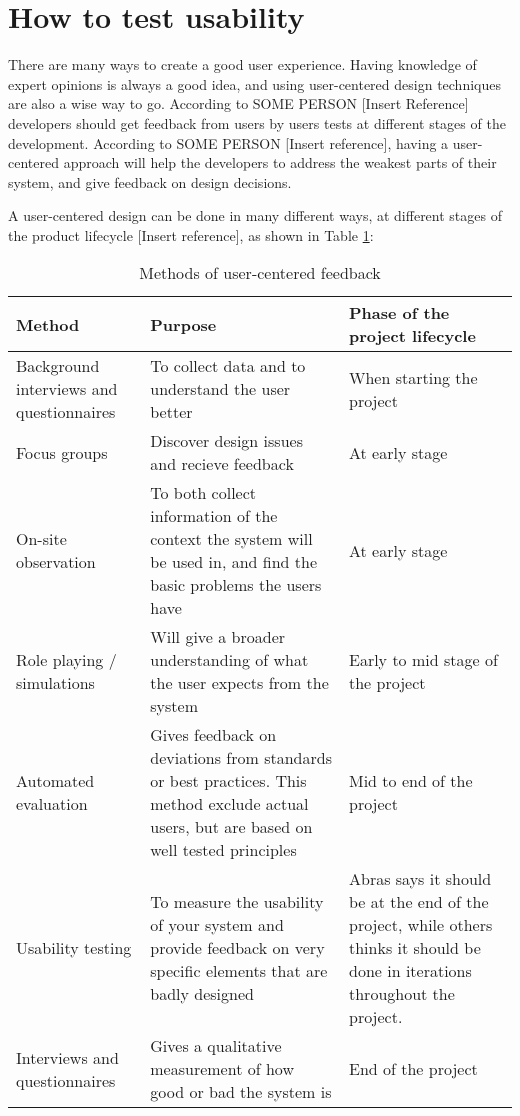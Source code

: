 \section{How to test usability}
There are many ways to create a good user experience. Having knowledge of expert opinions is always a good idea, and using user-centered design techniques are also a wise way to go. According to SOME PERSON [Insert Reference] developers should get feedback from users by users tests at different stages of the development. According to SOME PERSON [Insert reference], having a user-centered approach will help the developers to address the weakest parts of their system, and give feedback on design decisions. 

A user-centered design can be done in many different ways, at different stages of the product lifecycle [Insert reference], as shown in Table \ref{table:designduringlifecycle}:

\begin{table}[H]
\begin{tabular}{|p{5cm} | p{5cm} | p{5cm} |}
\hline
\textbf{Method} & \textbf{Purpose} & \textbf{Phase of the project lifecycle} \\ \hline
Background interviews and questionnaires & To collect data and to understand the user better & When starting the project \\ \hline
Focus groups & Discover design issues and recieve feedback & At early stage \\ \hline
On-site observation & To both collect information of the context the system will be used in, and find the basic problems the users have & At early stage \\ \hline
Role playing / simulations & Will give a broader understanding of what the user expects from the system & Early to mid stage of the project \\ \hline
Automated evaluation & Gives feedback on deviations from standards or best practices. This method exclude actual users, but are based on well tested principles & Mid to end of the project \\ \hline
Usability testing & To measure the usability of your system and provide feedback on very specific elements that are badly designed & Abras \cite{abrasusercentereddesign} says it should be at the end of the project, while others \cite{schneidermanusercentered} thinks it should be done in iterations throughout the project. \\ \hline
Interviews and questionnaires & Gives a qualitative measurement of how good or bad the system is & End of the project \\ \hline
\end{tabular}
\caption{Methods of user-centered feedback}
\label{table:designduringlifecycle}
\end{table}

